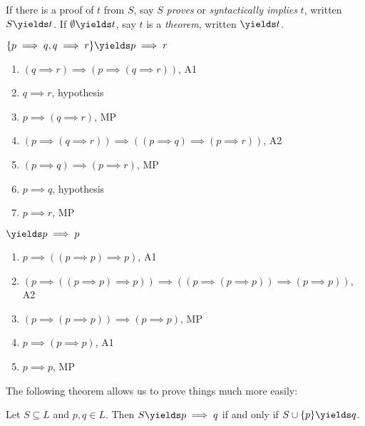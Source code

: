 \documentclass[a4paper]{article}
\begin{document}
\begin{definition}
  If there is a proof of \(t\) from \(S\), say \(S\) \emph{proves} or \emph{syntactically implies} \(t\), written \(S \yields t\). If \(\emptyset \yields t\), say \(t\) is a \emph{theorem}, written \(\yields t\).
\end{definition}

\begin{eg}
  \(\{p \implies q, q \implies r\} \yields p \implies r\)
  \begin{enumerate}
  \item \((q \implies r) \implies (p \implies (q \implies r))\), A1
  \item \(q \implies r\), hypothesis
  \item \(p \implies (q \implies r)\), MP
  \item \((p \implies (q \implies r)) \implies ((p \implies q) \implies (p \implies r))\), A2
  \item \((p \implies q) \implies (p \implies r)\), MP
  \item \(p \implies q\), hypothesis
  \item \(p \implies r\), MP
  \end{enumerate}
\end{eg}

\begin{eg}
  \(\yields p \implies p\)
  \begin{enumerate}
  \item \(p \implies ((p \implies p) \implies p)\), A1
  \item \((p \implies ((p \implies p) \implies p)) \implies ((p \implies (p \implies p)) \implies (p \implies p))\), A2
  \item \((p \implies (p \implies p)) \implies (p \implies p)\), MP
  \item \(p \implies (p \implies p)\), A1
  \item \(p \implies p\), MP
  \end{enumerate}
\end{eg}

The following theorem allows us to prove things much more easily:

\begin{theorem}\label{deduction theorem}
  Let \(S \subseteq L\) and \(p, q \in L\). Then \(S \yields p \implies q\) if and only if \(S \cup \{p\} \yields q\).
\end{theorem}
\end{document}
